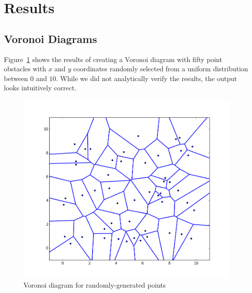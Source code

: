 \documentclass[conference]{IEEEtran}
\begin{document}
\section{Results}
\subsection{Voronoi Diagrams}
Figure~\ref{voronoi} shows the results of creating a Voronoi diagram with fifty
point obstacles with $x$ and $y$ coordinates randomly selected from a uniform
distribution between $0$ and $10$. While we did not analytically verify the
results, the output looks intuitively correct.

\begin{figure}[tp]
    \includegraphics[width=\columnwidth]{50}
    \caption{Voronoi diagram for randomly-generated points}\label{voronoi}
\end{figure}


%
%
\end{document}
